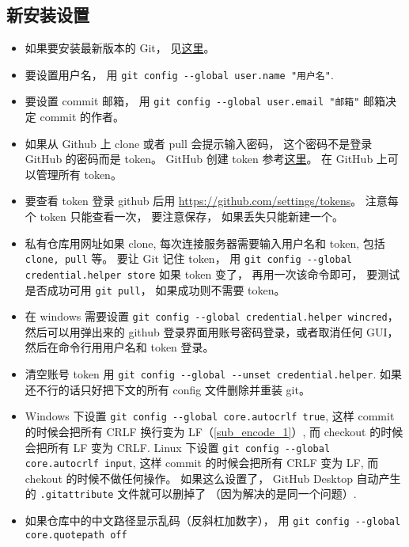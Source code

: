 \subsection{新安装设置}
\begin{itemize}
\item 如果要安装最新版本的 Git， 见\href{https://git-scm.com/downloads}{这里}。
\item 要设置用户名， 用 \verb`git config --global user.name "用户名"`.
\item 要设置 commit 邮箱， 用 \verb`git config --global user.email "邮箱"`  邮箱决定 commit 的作者。
\item 如果从 Github 上 clone 或者 pull 会提示输入密码， 这个密码不是登录 GitHub 的密码而是 token。 GitHub 创建 token 参考\href{https://docs.github.com/en/github/authenticating-to-github/keeping-your-account-and-data-secure/creating-a-personal-access-token#creating-a-token}{这里}。 在 GitHub 上可以管理所有 token。
\item 要查看 token 登录 github 后用 \href{https://github.com/settings/tokens/}{https://github.com/settings/tokens}。 注意每个 token 只能查看一次， 要注意保存， 如果丢失只能新建一个。
\item 私有仓库用网址如果 clone, 每次连接服务器需要输入用户名和 token, 包括 \verb`clone, pull` 等。 要让 Git 记住 token， 用 \verb`git config --global credential.helper store` 如果 token 变了， 再用一次该命令即可， 要测试是否成功可用 \verb`git pull`， 如果成功则不需要 token。
\item 在 windows 需要设置 \verb`git config --global credential.helper wincred`，然后可以用弹出来的 github 登录界面用账号密码登录，或者取消任何 GUI， 然后在命令行用用户名和 token 登录。
\item 清空账号 token 用 \verb`git config --global --unset credential.helper`. 如果还不行的话只好把下文的所有 config 文件删除并重装 git。
\item Windows 下设置 \verb`git config --global core.autocrlf true`, 这样 commit 的时候会把所有 CRLF 换行变为 LF（\autoref{sub_encode_1}）, 而 checkout 的时候会把所有 LF 变为 CRLF. Linux 下设置 \verb`git config --global core.autocrlf input`, 这样 commit 的时候会把所有 CRLF 变为 LF, 而 chekout 的时候不做任何操作。 如果这么设置了， GitHub Desktop 自动产生的 \verb`.gitattribute` 文件就可以删掉了 （因为解决的是同一个问题）.
\item 如果仓库中的中文路径显示乱码（反斜杠加数字）， 用 \verb`git config --global core.quotepath off`
\item 如果有时候在 windows 上 pull 提示文件名太长， 用 \verb`git config --global core.longpaths true`

\end{itemize}
